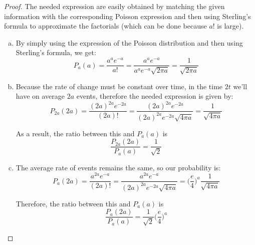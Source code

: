 \begin{proof}
    The needed expression are easily obtained by matching the given information with
    the corresponding Poisson expression and then using Sterling's formula to approximate
    the factorials (which can be done because $a!$ is large).

    \begin{enumerate}[(a)]
        \item By simply using the expression of the Poisson distribution and
            then using Sterling's formula, we get:
            \[
                P_a(a) = \frac{a^a e^{-a}}{a!} = \frac{a^a e^{-a}}{a^a e^{-a} \sqrt{2 \pi a}} 
                = \frac{1}{\sqrt{2 \pi a}}
            \] 

        \item Because the rate of change must be constant over time, in the time $2t$ 
            we'll have on average $2a$ events, therefore the needed expression is
            given by:
            \[
                P_{2a}(2a) = \frac{(2a)^{2a} e^{-2a}}{(2a)!} 
                = \frac{(2a)^{2a} e^{-2a}}{(2a)^{2a} e^{-2a} \sqrt{4\pi a}} 
                = \frac{1}{\sqrt{4\pi a}}
            \] 

            As a result, the ratio between this and $P_a(a)$ is
             \[
                 \frac{P_{2a}(2a)}{P_a(a)} = \frac{1}{\sqrt{2}}
            \] 

        \item The average rate of events remains the same, so our probability is:
            \[
                P_a(2a) = \frac{a^{2a} e^{-a}}{(2a)!}
                = \frac{a^{2a} e^{-a}}{(2a)^{2a} e^{-2a} \sqrt{4\pi a}} 
                = \bigg(\frac{e}{4}\bigg)^{a} \frac{1}{\sqrt{4\pi a}}
            \] 

            Therefore, the ratio between this and $P_a(a)$ is
            \[
                \frac{P_a(2a)}{P_a(a)} = \frac{1}{\sqrt{2}} \bigg(\frac{e}{4}\bigg)^a
            \] 
    \end{enumerate}
\end{proof}

